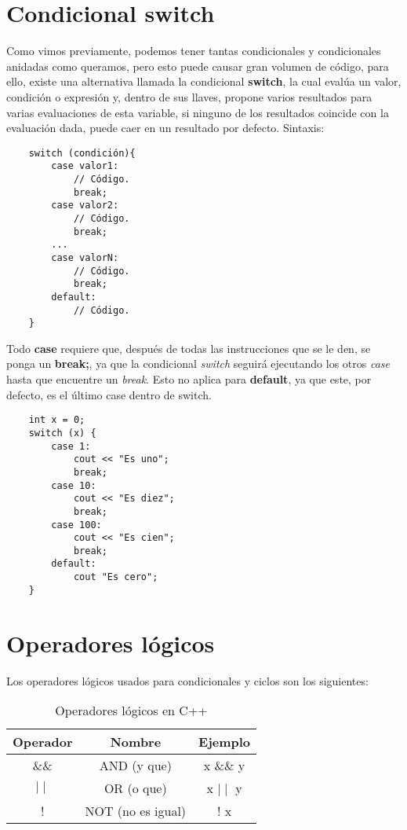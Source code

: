 \section{Condicional switch}

Como vimos previamente, podemos tener tantas condicionales y condicionales anidadas como queramos, pero esto puede causar gran volumen de código, para ello, existe una alternativa llamada la condicional \textbf{switch}, la cual evalúa un valor, condición o expresión y,  dentro de sus llaves, propone varios resultados para varias evaluaciones de esta variable, si ninguno de los resultados coincide con la evaluación dada, puede caer en un resultado por defecto. Sintaxis:
\begin{lstlisting}
    switch (condición){
        case valor1:
            // Código.
            break;
        case valor2:
            // Código.
            break;
        ...
        case valorN:
            // Código.
            break;
        default:
            // Código.
    }
\end{lstlisting}

Todo \textbf{case} requiere que, después de todas las instrucciones que se le den, se ponga un \textbf{break;}, ya que la condicional \textit{switch} seguirá ejecutando los otros \textit{case} hasta que encuentre un \textit{break}. Esto no aplica para \textbf{default}, ya que este, por defecto, es el último case dentro de switch.
\begin{lstlisting}
    int x = 0;
    switch (x) {
        case 1:
            cout << "Es uno";
            break;
        case 10:
            cout << "Es diez";
            break;
        case 100:
            cout << "Es cien";
            break;
        default:
            cout "Es cero";
    }
\end{lstlisting}



\section{Operadores lógicos}

Los operadores lógicos usados para condicionales y ciclos son los siguientes:
\begin{table}[H]
    \begin{center}
        \caption{Operadores lógicos en C++}
        \label{tab: 4}
        \begin{tabular}{c c c}
            \hline
            \textbf{Operador}&\textbf{Nombre}&\textbf{Ejemplo} \\
            \hline
            \&\&        & AND (y que)       & x \&\& y \\
            $\mid\mid$  & OR (o que)        & x $\mid\mid$ y \\
            !           & NOT (no es igual) & ! x \\
            \hline
        \end{tabular}
    \end{center}
\end{table}

